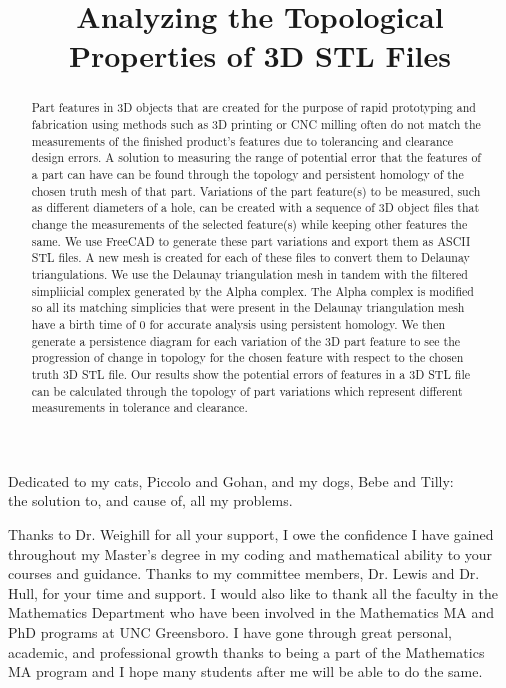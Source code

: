 \documentclass[ma]{uncgdissertationexp}
\title{Analyzing the Topological Properties of 3D STL Files}
\theoremstyle{plain}
\theoremstyle{definition}
\theoremstyle{remark}
\begin{document}
\frontmatter      %
\begin{abstract}
Part features in 3D objects that are created for the purpose of rapid prototyping and fabrication using methods such as 3D printing or CNC milling often do not match the measurements of the finished product's features due to tolerancing and clearance design errors. A solution to measuring the range of potential error that the features of a part can have can be found through the topology and persistent homology of the chosen truth mesh of that part. Variations of the part feature(s) to be measured, such as different diameters of a hole, can be created with a sequence of 3D object files that change the measurements of the selected feature(s) while keeping other features the same. We use FreeCAD to generate these part variations and export them as ASCII STL files. A new mesh is created for each of these files to convert them to Delaunay triangulations. We use the Delaunay triangulation mesh in tandem with the filtered simpliicial complex generated by the Alpha complex. The Alpha complex is modified so all its matching simplicies that were present in the Delaunay triangulation mesh have a birth time of 0 for accurate analysis using persistent homology. We then generate a persistence diagram for each variation of the 3D part feature to see the progression of change in topology for the chosen feature with respect to the chosen truth 3D STL file. Our results show the potential errors of features in a 3D STL file can be calculated through the topology of part variations which represent different measurements in tolerance and clearance.
\end{abstract}
\maketitlepage  
\begin{dedication}
Dedicated to my cats, Piccolo and Gohan, and my dogs, Bebe and Tilly:\\
the solution to, and cause of, all my problems.
\end{dedication}
\makeapprovalpage
\begin{acknowledgments}
\par Thanks to Dr. Weighill for all your support, I owe the confidence I have gained throughout my Master's degree in my coding and mathematical ability to your courses and guidance. Thanks to my committee members, Dr. Lewis and Dr. Hull, for your time and support. I would also like to thank all the faculty in the Mathematics Department who have been involved in the Mathematics MA and PhD programs at UNC Greensboro. I have gone through great personal, academic, and professional growth thanks to being a part of the Mathematics MA program and I hope many students after me will be able to do the same.
\end{acknowledgments}
\tableofcontents
\listoffigures
\listoftables
\mainmatter
\end{document}
